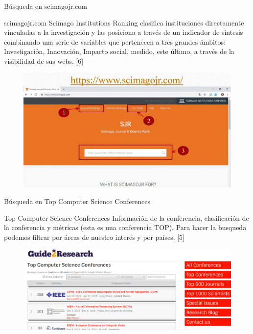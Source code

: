 \begin{frame}{Búsqueda en scimagojr.com}
\begin{block}{scimagojr.com}
Scimago Institutions Ranking clasifica instituciones directamente vinculadas a la investigación y las posiciona a través de un indicador de síntesis combinando una serie de variables que pertenecen a tres grandes ámbitos: Investigación, Innovación, Impacto social, medido, este último, a través de la visibilidad de sus webs. [6]
\end{block}   
\begin{figure}[H]
    \includegraphics[scale=0.4]{images/webcite2.png}
    \label{fig:boat1}
\end{figure}
\end{frame}

\begin{frame}{Búsqueda en Top Computer Science Conferences}
\begin{block}{Top Computer Science Conferences}
Información de la conferencia, clasificación de la conferencia y métricas (esta es una conferencia TOP). Para hacer la busqueda podemos filtrar por áreas de nuestro interés y por países. [5]
\end{block}   
\begin{figure}[H]
    \includegraphics[scale=0.3]{images/top.png}
    \label{fig:boat1}
\end{figure}
\end{frame}

